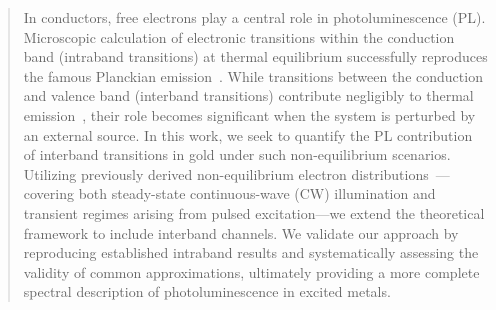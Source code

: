 \begin{abstract}
In conductors, free electrons play a central role in photoluminescence (PL). Microscopic calculation of electronic transitions within the conduction band (intraband transitions) at thermal equilibrium successfully reproduces the famous Planckian emission~\cite{SivanDubi2021HotPL}. While transitions between the conduction and valence band (interband transitions) contribute negligibly to thermal emission~\cite{MariniEtAl2013UltrafastSPP}, their role becomes significant when the system is perturbed by an external source. In this work, we seek to quantify the PL contribution of interband transitions in gold under such non-equilibrium scenarios. Utilizing previously derived non-equilibrium electron distributions~\cite{SivanDubi2021HotPL, DubiSivan2019HotElectrons}---covering both steady-state continuous-wave (CW) illumination and transient regimes arising from pulsed excitation---we extend the theoretical framework to include interband channels. We validate our approach by reproducing established intraband results and systematically assessing the validity of common approximations, ultimately providing a more complete spectral description of photoluminescence in excited metals.
\end{abstract}